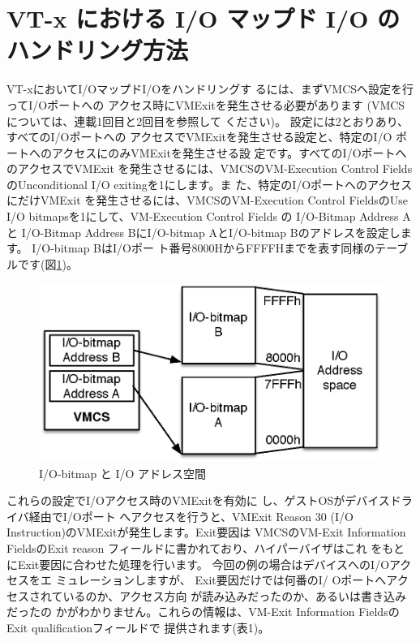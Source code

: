 \section{VT-x における I/O マップド I/O のハンドリング方法}

 VT-xにおいてI/OマップドI/Oをハンドリングす
るには、まずVMCSへ設定を行ってI/Oポートへの
アクセス時にVMExitを発生させる必要があります
(VMCSについては、連載1回目と2回目を参照して
ください)。
 設定には2とおりあり、すべてのI/Oポートへの
アクセスでVMExitを発生させる設定と、特定のI/O
ポートへのアクセスにのみVMExitを発生させる設
定です。すべてのI/OポートへのアクセスでVMExit
を発生させるには、VMCSのVM-Execution Control
FieldsのUnconditional I/O exitingを1にします。ま
た、特定のI/OポートへのアクセスにだけVMExit
を発生させるには、VMCSのVM-Execution Control
FieldsのUse I/O bitmapsを1にして、VM-Execution
Control Fields の I/O-Bitmap Address A と
I/O-Bitmap Address BにI/O-bitmap AとI/O-bitmap
Bのアドレスを設定します。 I/O-bitmap BはI/Oポー
ト番号8000HからFFFFHまでを表す同様のテーブルです(図\ref{fig1})。

\begin{figure}\centering
\includegraphics{figures/part3_fig1_IO_bitmaps.eps}
\caption{I/O-bitmap と I/O アドレス空間}
\label{fig1}
\end{figure}

 これらの設定でI/Oアクセス時のVMExitを有効に
し、ゲストOSがデバイスドライバ経由でI/Oポート
へアクセスを行うと、VMExit Reason 30 (I/O
Instruction)のVMExitが発生します。Exit要因は
VMCSのVM-Exit Information FieldsのExit reason
フィールドに書かれており、ハイパーバイザはこれ
をもとにExit要因に合わせた処理を行います。
 今回の例の場合はデバイスへのI/Oアクセスをエ
ミュレーションしますが、 Exit要因だけでは何番のI/
Oポートへアクセスされているのか、アクセス方向
が読み込みだったのか、あるいは書き込みだったの
かがわかりません。これらの情報は、VM-Exit
Information FieldsのExit qualificationフィールドで
提供されます(表1)。

